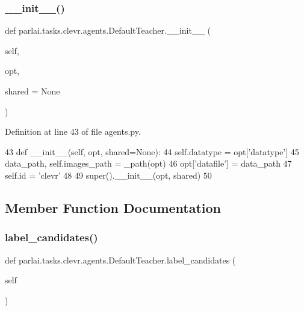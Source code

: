 \subsubsection{\texorpdfstring{\+\_\+\+\_\+init\+\_\+\+\_\+()}{\_\_init\_\_()}}
{\footnotesize\ttfamily def parlai.\+tasks.\+clevr.\+agents.\+Default\+Teacher.\+\_\+\+\_\+init\+\_\+\+\_\+ (\begin{DoxyParamCaption}\item[{}]{self,  }\item[{}]{opt,  }\item[{}]{shared = {\ttfamily None} }\end{DoxyParamCaption})}



Definition at line 43 of file agents.\+py.


\begin{DoxyCode}
43     \textcolor{keyword}{def }\_\_init\_\_(self, opt, shared=None):
44         self.datatype = opt[\textcolor{stringliteral}{'datatype'}]
45         data\_path, self.images\_path = \_path(opt)
46         opt[\textcolor{stringliteral}{'datafile'}] = data\_path
47         self.id = \textcolor{stringliteral}{'clevr'}
48 
49         super().\_\_init\_\_(opt, shared)
50 
\end{DoxyCode}


\subsection{Member Function Documentation}
\mbox{\label{classparlai_1_1tasks_1_1clevr_1_1agents_1_1DefaultTeacher_a5d5bf049239e335502995a785c292f64}} 
\subsubsection{\texorpdfstring{label\+\_\+candidates()}{label\_candidates()}}
{\footnotesize\ttfamily def parlai.\+tasks.\+clevr.\+agents.\+Default\+Teacher.\+label\+\_\+candidates (\begin{DoxyParamCaption}\item[{}]{self }\end{DoxyParamCaption})}



